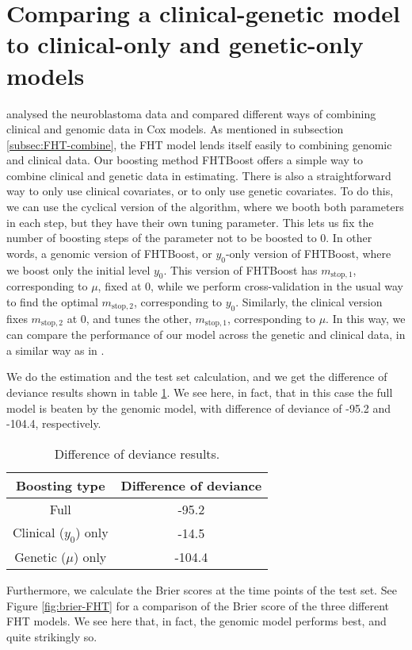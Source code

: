 \section{Comparing a clinical-genetic model to clinical-only and genetic-only models}
\citet{bovelstad2009} analysed the neuroblastoma data and compared different ways of combining clinical and genomic data in Cox models.
As mentioned in subsection \ref{subsec:FHT-combine}, the FHT model lends itself easily to combining genomic and clinical data.
Our boosting method FHTBoost offers a simple way to combine clinical and genetic data in estimating.
There is also a straightforward way to only use clinical covariates, or to only use genetic covariates.
To do this, we can use the cyclical version of the algorithm, where we booth both parameters in each step, but they have their own tuning parameter.
This lets us fix the number of boosting steps of the parameter not to be boosted to 0.
In other words, a genomic version of FHTBoost, or $y_0$-only version of FHTBoost, where we boost only the initial level $y_0$.
This version of FHTBoost has $m_{\text{stop},1}$, corresponding to $\mu$, fixed at 0, while we perform cross-validation in the usual way to find the optimal $m_{\text{stop},2}$, corresponding to $y_0$.
Similarly, the clinical version fixes $m_{\text{stop},2}$ at 0, and tunes the other, $m_{\text{stop},1}$, corresponding to $\mu$.
In this way, we can compare the performance of our model across the genetic and clinical data, in a similar way as in \citet{bovelstad2009}.

We do the estimation and the test set calculation, and we get the difference of deviance results shown in table \ref{tab:deviances}.
We see here, in fact, that in this case the full model is beaten by the genomic model, with difference of deviance of -95.2 and -104.4, respectively.

\begin{table}
\caption{Difference of deviance results.}
\label{tab:deviances}
\centering
\begin{tabular}{cc}
\toprule
Boosting type & Difference of deviance \\
\hline
Full & -95.2 \\
Clinical ($y_0$) only  & -14.5 \\
Genetic ($\mu$) only & -104.4 \\
\bottomrule
\end{tabular}
\end{table}

Furthermore, we calculate the Brier scores at the time points of the test set.
See Figure \ref{fig:brier-FHT} for a comparison of the Brier score of the three different FHT models.
We see here that, in fact, the genomic model performs best, and quite strikingly so.


